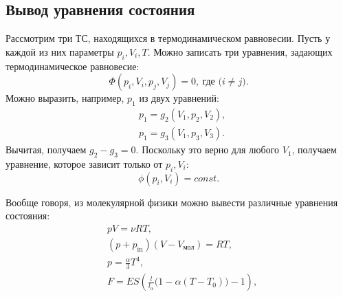 \documentclass[../main.tex]{subfiles}
\begin{document}
    \subsection{Вывод уравнения состояния}
    Рассмотрим три ТС, находящихся в термодинамическом равновесии. Пусть у каждой из них параметры $p_i, V_i, T$. Можно записать три уравнения, задающих термодинамическое равновесие: 
    \begin{equation}
        \Phi (p_i, V_i, p_j, V_j) = 0,\ \mbox{где ($i \neq j$)}.
    \end{equation}
    Можно выразить, например, $p_1$ из двух уравнений: 
    \begin{eqnarray}
        &p_1 = g_2 (V_1, p_2, V_2), \\
        &p_1 = g_3 (V_1, p_3, V_3).
    \end{eqnarray}
    Вычитая, получаем $g_2 - g_3 = 0$. Поскольку это верно для любого $V_1$, получаем уравнение, которое зависит только от $p_i, V_i$:
    \begin{equation}
        \phi (p_i, V_i) = const.
    \end{equation}
    \begin{addition}
        Вообще говоря, из молекулярной физики можно вывести различные уравнения состояния: 
        \begin{align}
            &pV = \nu RT, \\
            &(p + p_{\text{in}})(V - V_{\text{мол}}) = RT, \\
            &p = \frac{\alpha}{3} T^4, \\
            &F = ES \left(\frac{l}{l_\alpha}\big(1 - \alpha(T - T_0)\big) - 1\right),
        \end{align}
    \end{addition}
\end{document}
